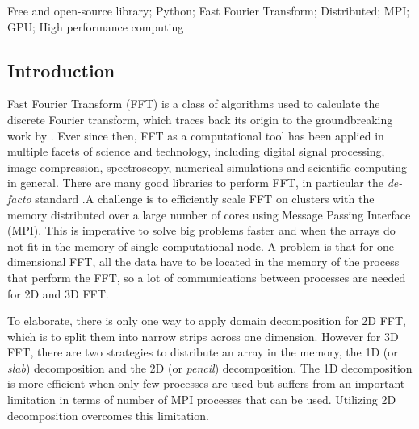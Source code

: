 
Free and open-source library; Python; Fast Fourier Transform; Distributed; MPI;
GPU; High performance computing%

\subsection{Introduction}


Fast Fourier Transform (FFT) is a class of algorithms used to calculate the
discrete Fourier transform, which traces back its origin to the groundbreaking
work by \citet{cooley_tukey}.
%
Ever since then, FFT as a computational tool has been applied in multiple
facets of science and technology, including digital signal processing, image
compression, spectroscopy, numerical simulations and scientific computing in
general. There are many good libraries to perform FFT, in particular the
\emph{de-facto} standard  \citep{frigo2005design}.\@ A challenge
is to efficiently scale FFT on clusters with the memory distributed over a
large number of cores using Message Passing Interface (MPI). This is imperative
to solve big problems faster and when the arrays do not fit in the memory of
single computational node.
%
A problem is that for one-dimensional FFT, all the data have to be located in the
memory of the process that perform the FFT, so a lot of communications between
processes are needed for 2D and 3D FFT.

To elaborate, there is only one way to apply domain decomposition for 2D FFT,
which is to split them into narrow strips across one dimension. However for 3D
FFT, there are two strategies to distribute an array in the memory, the 1D (or
\emph{slab}) decomposition and the 2D (or \emph{pencil}) decomposition. The 1D
decomposition is more efficient when only few processes are used but suffers
from an important limitation in terms of number of MPI processes that can be
used. Utilizing 2D decomposition overcomes this limitation.

